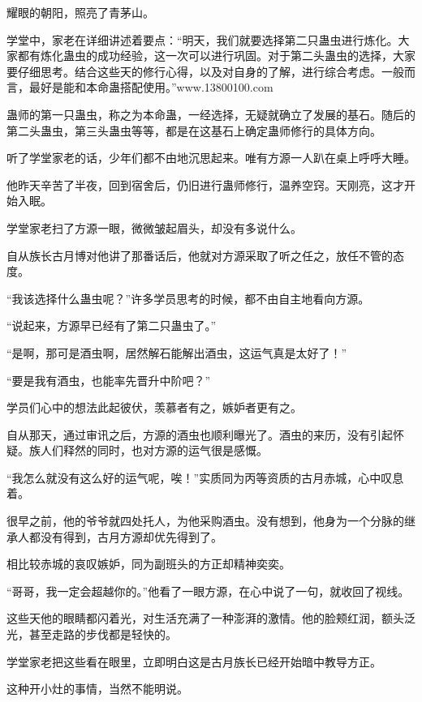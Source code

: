 
\begin{this_body}

耀眼的朝阳，照亮了青茅山。

学堂中，家老在详细讲述着要点：“明天，我们就要选择第二只蛊虫进行炼化。大家都有炼化蛊虫的成功经验，这一次可以进行巩固。对于第二头蛊虫的选择，大家要仔细思考。结合这些天的修行心得，以及对自身的了解，进行综合考虑。一般而言，最好是能和本命蛊搭配使用。”www.13800100.com

蛊师的第一只蛊虫，称之为本命蛊，一经选择，无疑就确立了发展的基石。随后的第二头蛊虫，第三头蛊虫等等，都是在这基石上确定蛊师修行的具体方向。

听了学堂家老的话，少年们都不由地沉思起来。唯有方源一人趴在桌上呼呼大睡。

他昨天辛苦了半夜，回到宿舍后，仍旧进行蛊师修行，温养空窍。天刚亮，这才开始入眠。

学堂家老扫了方源一眼，微微皱起眉头，却没有多说什么。

自从族长古月博对他讲了那番话后，他就对方源采取了听之任之，放任不管的态度。

“我该选择什么蛊虫呢？”许多学员思考的时候，都不由自主地看向方源。

“说起来，方源早已经有了第二只蛊虫了。”

“是啊，那可是酒虫啊，居然解石能解出酒虫，这运气真是太好了！”

“要是我有酒虫，也能率先晋升中阶吧？”

学员们心中的想法此起彼伏，羡慕者有之，嫉妒者更有之。

自从那天，通过审讯之后，方源的酒虫也顺利曝光了。酒虫的来历，没有引起怀疑。族人们释然的同时，也对方源的运气很是感慨。

“我怎么就没有这么好的运气呢，唉！”实质同为丙等资质的古月赤城，心中叹息着。

很早之前，他的爷爷就四处托人，为他采购酒虫。没有想到，他身为一个分脉的继承人都没有得到，古月方源却优先得到了。

相比较赤城的哀叹嫉妒，同为副班头的方正却精神奕奕。

“哥哥，我一定会超越你的。”他看了一眼方源，在心中说了一句，就收回了视线。

这些天他的眼睛都闪着光，对生活充满了一种澎湃的激情。他的脸颊红润，额头泛光，甚至走路的步伐都是轻快的。

学堂家老把这些看在眼里，立即明白这是古月族长已经开始暗中教导方正。

这种开小灶的事情，当然不能明说。


\end{this_body}
